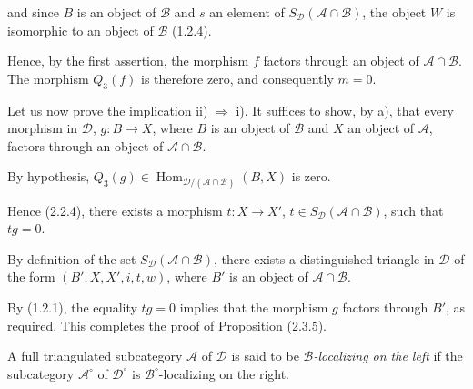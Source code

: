 \clearpage
{}%
\begingroup
\small
\setlength{\parskip}{0pt}%
\setlength{\emergencystretch}{1.5em}%

\noindent and since $B$ is an object of $\mathcal B$ and $s$ an element of
$S_{\mathcal D}(\mathcal A\cap\mathcal B)$, the object $W$ is isomorphic to
an object of $\mathcal B$ (1.2.4).

Hence, by the first assertion, the morphism $f$ factors through an object
of $\mathcal A\cap\mathcal B$. The morphism $Q_3(f)$ is therefore zero,
and consequently $m=0$.

Let us now prove the implication ii) $\Rightarrow$ i). It suffices to show,
by a), that every morphism in $\mathcal D$, $g\colon B\longrightarrow X$,
where $B$ is an object of $\mathcal B$ and $X$ an object of $\mathcal A$,
factors through an object of $\mathcal A\cap\mathcal B$.

By hypothesis,
$Q_3(g)\in
\operatorname{Hom}_{\mathcal D/(\mathcal A\cap\mathcal B)}(B,X)$ is zero.

Hence (2.2.4), there exists a morphism
$t\colon X\longrightarrow X'$, $t\in
S_{\mathcal D}(\mathcal A\cap\mathcal B)$, such that $tg=0$.

By definition of the set $S_{\mathcal D}(\mathcal A\cap\mathcal B)$,
there exists a distinguished triangle in $\mathcal D$ of the form
$(B',X,X',i,t,w)$, where $B'$ is an object of
$\mathcal A\cap\mathcal B$.

By (1.2.1), the equality $tg=0$ implies that the morphism $g$ factors
through $B'$, as required. This completes the proof of Proposition (2.3.5).

\medskip
A full triangulated subcategory $\mathcal A$ of $\mathcal D$ is said to be
\emph{$\mathcal B$-localizing on the left} if the subcategory
$\mathcal A^\circ$ of $\mathcal D^\circ$ is
$\mathcal B^\circ$-localizing on the right.
\endgroup
